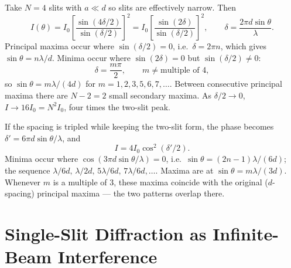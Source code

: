 \begin{example}
Take $N=4$ slits with $a \ll d$ so slits are effectively narrow. Then
\begin{equation}
    I(\theta) = I_0 \left[\frac{\sin(4\delta/2)}{\sin(\delta/2)}\right]^2 = I_0 \left[\frac{\sin(2\delta)}{\sin(\delta/2)}\right]^2, \qquad \delta = \frac{2\pi d \sin\theta}{\lambda}.
\end{equation}
Principal maxima occur where $\sin(\delta/2) = 0$, i.e.\ $\delta = 2\pi n$, which gives $\sin\theta = n\lambda/d$. Minima occur where $\sin(2\delta) = 0$ but $\sin(\delta/2) \ne 0$:
\begin{equation}
    \delta = \frac{m\pi}{2}, \qquad m \ne \text{multiple of }4,
\end{equation}
so $\sin\theta = m\lambda/(4d)$ for $m = 1, 2, 3, 5, 6, 7, \ldots$. Between consecutive principal maxima there are $N-2 = 2$ small secondary maxima. As $\delta/2 \to 0$, $I \to 16 I_0 = N^2 I_0$, four times the two-slit peak.
\end{example}

\begin{example}
If the spacing is tripled while keeping the two-slit form, the phase becomes $\delta' = 6\pi d\sin\theta/\lambda$, and
\begin{equation}
    I = 4 I_0 \cos^2(\delta'/2).
\end{equation}
Minima occur where $\cos(3\pi d\sin\theta/\lambda) = 0$, i.e.\ $\sin\theta = (2n-1)\lambda/(6d)$; the sequence $\lambda/6d,\, \lambda/2d,\, 5\lambda/6d,\, 7\lambda/6d,\ldots$. Maxima are at $\sin\theta = m\lambda/(3d)$. Whenever $m$ is a multiple of $3$, these maxima coincide with the original ($d$-spacing) principal maxima --- the two patterns overlap there.
\end{example}

\section{Single-Slit Diffraction as Infinite-Beam Interference}
\label{sec:single-slit}

